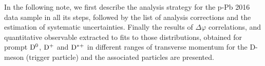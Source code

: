In the following note, we first describe the analysis strategy for the p-Pb 2016 data sample in all its steps, followed by the list of analysis corrections and the estimation of systematic uncertainties. Finally the results of $\Delta\varphi$ correlations, and quantitative observable extracted to fits to those distributions, obtained for prompt $\rm{D^0}$, $\rm{D^{+}}$ and $\rm{D^{*+}}$ in different ranges of transverse momentum for the D-meson (trigger particle) and the associated particles are presented.
